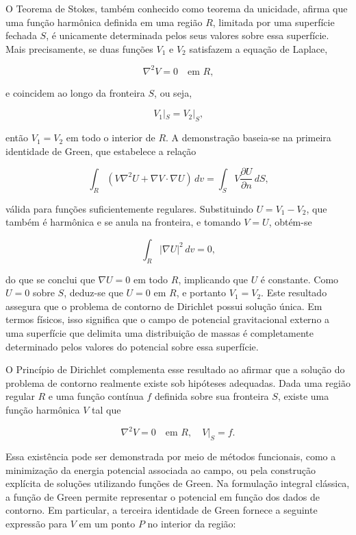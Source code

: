 O Teorema de Stokes, também conhecido como teorema da unicidade, afirma que uma função harmônica definida em uma região \( R \), limitada por uma superfície fechada \( S \), é unicamente determinada pelos seus valores sobre essa superfície. Mais precisamente, se duas funções \( V_1 \) e \( V_2 \) satisfazem a equação de Laplace,

\[
\nabla^2 V = 0 \quad \text{em } R \text{,}
\]

\noindent
e coincidem ao longo da fronteira \( S \), ou seja,

\[
V_1|_S = V_2|_S \text{,}
\]

\noindent
então \( V_1 = V_2 \) em todo o interior de \( R \). A demonstração baseia-se na primeira identidade de Green, que estabelece a relação

\[
\int_R (V \nabla^2 U + \nabla V \cdot \nabla U) \, dv = \int_S V \frac{\partial U}{\partial n} \, dS \text{,}
\]

\noindent
válida para funções suficientemente regulares. Substituindo \( U = V_1 - V_2 \), que também é harmônica e se anula na fronteira, e tomando \( V = U \), obtém-se

\[
\int_R |\nabla U|^2 \, dv = 0 \text{,}
\]

\noindent
do que se conclui que \( \nabla U = 0 \) em todo \( R \), implicando que \( U \) é constante. Como \( U = 0 \) sobre \( S \), deduz-se que \( U = 0 \) em \( R \), e portanto \( V_1 = V_2 \). Este resultado assegura que o problema de contorno de Dirichlet possui solução única. Em termos físicos, isso significa que o campo de potencial gravitacional externo a uma superfície que delimita uma distribuição de massas é completamente determinado pelos valores do potencial sobre essa superfície.

O Princípio de Dirichlet complementa esse resultado ao afirmar que a solução do problema de contorno realmente existe sob hipóteses adequadas. Dada uma região regular \( R \) e uma função contínua \( f \) definida sobre sua fronteira \( S \), existe uma função harmônica \( V \) tal que

\[
\nabla^2 V = 0 \quad \text{em } R, \quad V|_S = f \text{.}
\]

\noindent
Essa existência pode ser demonstrada por meio de métodos funcionais, como a minimização da energia potencial associada ao campo, ou pela construção explícita de soluções utilizando funções de Green. Na formulação integral clássica, a função de Green permite representar o potencial em função dos dados de contorno. Em particular, a terceira identidade de Green fornece a seguinte expressão para \( V \) em um ponto \( P \) no interior da região:

